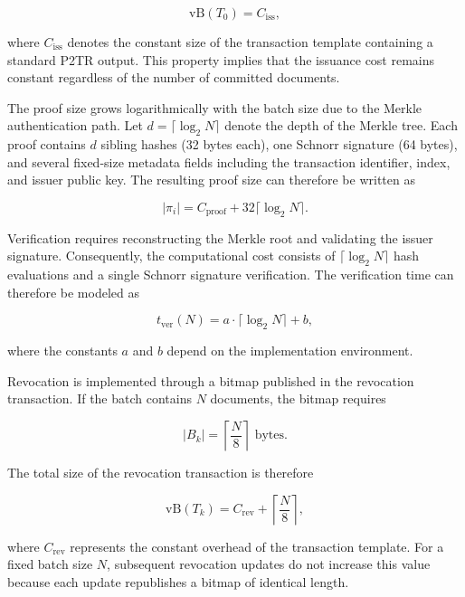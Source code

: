 \documentclass{IEEEoj}
\begin{document}
\begin{equation}
\mathrm{vB}(T_0) = C_{\mathrm{iss}},
\end{equation}

where $C_{\mathrm{iss}}$ denotes the constant size of the transaction template containing a standard P2TR output. 
This property implies that the issuance cost remains constant regardless of the number of committed documents.

The proof size grows logarithmically with the batch size due to the Merkle authentication path. 
Let $d = \lceil \log_2 N \rceil$ denote the depth of the Merkle tree. 
Each proof contains $d$ sibling hashes (32 bytes each), one Schnorr signature (64 bytes), and several fixed-size metadata fields including the transaction identifier, index, and issuer public key. 
The resulting proof size can therefore be written as

\begin{equation}
|\pi_i| = C_{\mathrm{proof}} + 32\lceil\log_2 N\rceil.
\end{equation}

Verification requires reconstructing the Merkle root and validating the issuer signature. 
Consequently, the computational cost consists of $\lceil\log_2 N\rceil$ hash evaluations and a single Schnorr signature verification. 
The verification time can therefore be modeled as

\begin{equation}
t_{\mathrm{ver}}(N) = a \cdot \lceil\log_2 N\rceil + b,
\end{equation}

where the constants $a$ and $b$ depend on the implementation environment.

Revocation is implemented through a bitmap published in the revocation transaction. 
If the batch contains $N$ documents, the bitmap requires

\begin{equation}
|B_k| = \left\lceil \frac{N}{8} \right\rceil \text{ bytes}.
\end{equation}

The total size of the revocation transaction is therefore

\begin{equation}
\mathrm{vB}(T_k) = C_{\mathrm{rev}} + \left\lceil \frac{N}{8} \right\rceil,
\end{equation}

where $C_{\mathrm{rev}}$ represents the constant overhead of the transaction template. 
For a fixed batch size $N$, subsequent revocation updates do not increase this value because each update republishes a bitmap of identical length.
\end{document}
